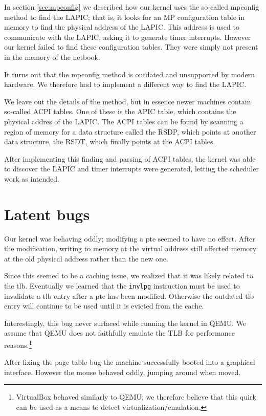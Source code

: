 \documentclass{report}
\begin{document}
In section \ref{sec:mpconfig} we described how our kernel uses the so-called
\gls{mpconfig} method to find the LAPIC; that is, it looks for an MP
configuration table in memory to find the physical address of the LAPIC. This
address is used to communicate with the LAPIC, asking it to generate timer
interrupts. However our kernel failed to find these configuration tables. They
were simply not present in the memory of the netbook.

It turns out that the \gls{mpconfig} method is outdated and unsupported by
modern hardware. We therefore had to implement a different way to find the
LAPIC.

We leave out the details of the method, but in essence newer machines contain
so-called ACPI tables. One of these is the APIC table, which contains the
physical addres of the LAPIC. The ACPI tables can be found by scanning a
region of memory for a data structure called the RSDP, which points at another
data structure, the RSDT, which finally points at the ACPI tables.

After implementing this finding and parsing of ACPI tables, the kernel was
able to discover the LAPIC and timer interrupts were generated, letting the
scheduler work as intended.


\section{Latent bugs}
Our kernel was behaving oddly; modifying a \gls{pte} seemed to have no effect.
After the modification, writing to memory at the virtual address still
affected memory at the old physical address rather than the new one.

Since this seemed to be a caching issue, we realized that it was likely
related to the \gls{tlb}. Eventually we learned that the \texttt{invlpg}
instruction must be used to invalidate a \gls{tlb} entry after a \gls{pte} has
been modified. Otherwise the outdated \gls{tlb} entry will continue to be used
until it is evicted from the cache.

Interestingly, this bug never surfaced while running the kernel in QEMU. We
assume that QEMU does not faithfully emulate the TLB for performance
reasons.\footnote{VirtualBox behaved similarly to QEMU; we therefore believe
that this quirk can be used as a means to detect virtualization/emulation.}

After fixing the page table bug the machine successfully booted into a
graphical interface. However the mouse behaved oddly, jumping around when
moved.
\end{document}
